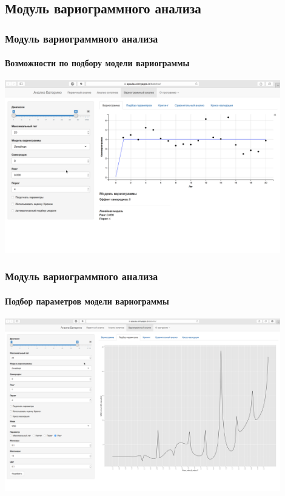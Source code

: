 \documentclass{beamer}
\begin{document}
\subsection{Модуль вариограммного анализа}
\begin{frame}
  \frametitle{Модуль вариограммного анализа}
  \framesubtitle{Возможности по подбору модели вариограммы}
  \begin{center}
    \includegraphics[width=0.9\textwidth]{../../figures/static/4_variogram.png}
  \end{center}
\end{frame}

\begin{frame}
  \frametitle{Модуль вариограммного анализа}
  \framesubtitle{Подбор параметров модели вариограммы}
  \begin{center}
    \includegraphics[width=0.9\textwidth]{../../figures/static/5_fit.png}
  \end{center}
\end{frame}
\end{document}
